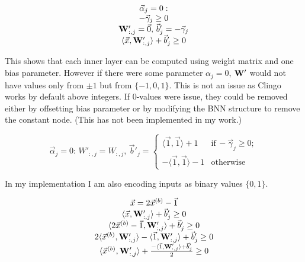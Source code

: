 \documentclass{fithesis}
\begin{document}
\begin{equation*}
    \begin{matrix}
        \vec\alpha_j = 0: \\
        - \vec\gamma_j \geq 0\\
        \mathbf{W}'_{:, j} = \vec 0, \,
        \vec b'_j = - \vec\gamma_j\\
        \langle \vec x, \mathbf{W}'_{:, j}\rangle + \vec b'_j \geq 0\\
    \end{matrix}
\end{equation*}

This shows that each inner layer can be computed using weight matrix and
one bias parameter. However if there were some parameter $\alpha_j = 0$,
$\mathbf{W}'$ would not have values only from $\pm 1$ but from $\{-1, 0, 1\}$.
This is not an issue as Clingo works by default above integers.
If 0-values were issue, they could be removed either by offsetting bias
parameter or by modifying the BNN structure to remove the constant node.
(This has not been implemented in my work.)

\begin{equation*}
    \vec \alpha_j = 0:\, W'_{:,j} = W_{:,j},\, \vec b'_j = \left\{
        \begin{matrix}
            \langle\vec 1, \vec 1\rangle + 1 & \mathrm{if}\,-\vec\gamma_j \geq 0;\\
            -\langle\vec 1, \vec 1\rangle - 1 & \mathrm{otherwise}
        \end{matrix}
    \right.
\end{equation*}

In my implementation I am also encoding inputs as binary values $\{0, 1\}$.

\begin{equation*}
    \begin{matrix}
        \vec x = 2 \vec x^{(b)} - \vec1\\
        \langle \vec x, \mathbf{W}'_{:, j}\rangle + \vec b'_j \geq 0\\
        \langle 2\vec x^{(b)} - \vec1, \mathbf{W}'_{:, j}\rangle + \vec b'_j \geq 0\\
        2\langle \vec x^{(b)}, \mathbf{W}'_{:, j}\rangle - \langle\vec1, \mathbf{W}'_{:,j}\rangle + \vec b'_j \geq 0\\
        \langle \vec x^{(b)}, \mathbf{W}'_{:, j}\rangle + \frac{- \langle\vec1, \mathbf{W}'_{:,j}\rangle + \vec b'_j}{2} \geq 0\\
    \end{matrix}
\end{equation*}
\end{document}
